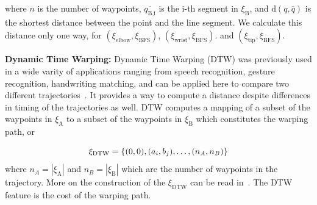 \documentclass[letterpaper, 10 pt, conference]{ieeeconf}  %
\newcommand{\tj}[1]{\ensuremath{\xi_\text{#1}}}
\begin{document}
where $n$ is the number of waypoints, $\overline{q_\text{B,i}}$ is the i-th segment in \tj{B}, and $\text{d}(q, \overline{q})$ is the shortest distance between the point and the line segment. We calculate this distance only one way, for $(\tj{elbow},\tj{BFS})$, $(\tj{wrist},\tj{BFS})$. and $(\tj{tip},\tj{BFS})$.

{\bf Dynamic Time Warping:} Dynamic Time Warping (DTW) was previously used in a wide varity of applications ranging from speech recognition, gesture recognition, handwriting matching, and can be applied here to compare two different trajectories~\cite{senin2008dynamic}. It provides a way to compute a distance despite differences in timing of the trajectories as well. DTW computes a mapping of a subset of the waypoints in $\xi_\text{A}$ to a subset of the waypoints in $\xi_\text{B}$ which constitutes the warping path, or

\begin{equation}
\xi_\text{DTW} = \{ (0, 0), (a_i, b_j), \mathellipsis ,(n_A, n_B) \}
\end{equation} where $n_A = |\tj{A}|$ and $n_B = |\tj{B}|$ which are the number of waypoints in the trajectory. More on the construction of the \tj{DTW} can be read in~\cite{senin2008dynamic}. The DTW feature is the cost of the warping path.
\end{document}
